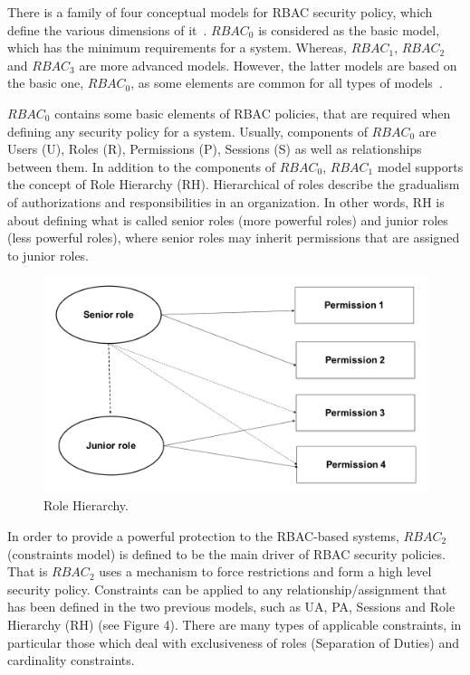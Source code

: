 There is a family of four conceptual models for RBAC security policy, which define the various dimensions of it~\cite{PTN2009}. $RBAC_0$ is considered as the basic model, which has the minimum requirements for a system.  Whereas, $RBAC_1$, $RBAC_2$ and $RBAC_3$ are more advanced models.  However, the latter models are based on the basic one, $RBAC_0$, as some elements are common for all types of models~\cite{AhHu2007}.

$RBAC_0$ contains some basic elements of RBAC policies, that are required when defining any security policy for a system.  Usually, components of $RBAC_0$ are Users (U), Roles (R), Permissions (P), Sessions (S) as well as relationships between them. In addition to the components of $RBAC_0$, $RBAC_1$ model supports the concept of Role Hierarchy (RH).  Hierarchical of roles describe the gradualism of authorizations and responsibilities in an organization.  In other words, RH is about defining what is called senior roles (more powerful roles) and junior roles (less powerful roles), where senior roles may inherit permissions that are assigned to junior roles.

\begin{figure}[bht]
\centering
\includegraphics[scale=0.26]{RolesHierachy.png}
\caption{Role Hierarchy.}
\label{fig:RBACPol}
\end{figure}

In order to provide a powerful protection to the RBAC-based systems, $RBAC_2$ (constraints model) is defined to be the main driver of RBAC security policies.  That is $RBAC_2$ uses a mechanism to force restrictions and form a high level security policy.  Constraints can be applied to any relationship/assignment that has been defined in the two previous models, such as UA, PA, Sessions and Role Hierarchy (RH) (see Figure 4).  There are many types of applicable constraints, in particular those which deal with exclusiveness of roles (Separation of Duties) and cardinality constraints.


